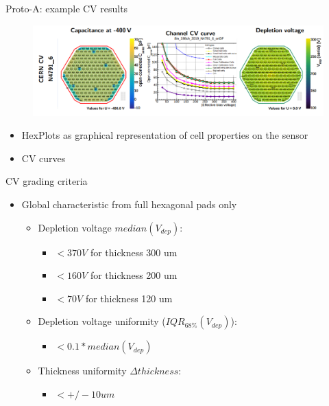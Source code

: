\documentclass{beamer}
\begin{document}
\begin{frame}{Proto-A: example CV results}
  \begin{figure}
      \includegraphics[width=1.0\textwidth]{plots/CV_example.png}    
  \end{figure}
  \begin{itemize}
    \item HexPlots as graphical representation of cell properties on the sensor
    \item CV curves
  \end{itemize}
\end{frame}

\begin{frame}{CV grading criteria}
  \begin{itemize}
      \item \alert{Global} characteristic from full hexagonal pads only
        \begin{itemize}
          \item Depletion voltage $ median(V_{dep}) $:
            \begin{itemize}
             \item $ < 370 V $ for thickness 300 um
             \item $ < 160 V $ for thickness 200 um
             \item $ < 70 V $ for thickness 120 um  
            \end{itemize}
          \item Depletion voltage uniformity ($ IQR_{68\%}(V_{dep}) $):
            \begin{itemize}
              \item $< 0.1 * median(V_{dep})$
            \end{itemize}
          \item Thickness uniformity ${\Delta} thickness$:
            \begin{itemize}
              \item $< +/- 10um $
            \end{itemize}
        \end{itemize}
  \end{itemize}
\end{frame}
\end{document}

